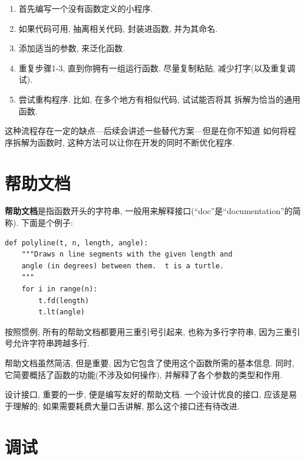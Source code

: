\documentclass[10pt]{book}
\begin{document}
\begin{enumerate}

\item 首先编写一个没有函数定义的小程序.

\item 如果代码可用, 抽离相关代码, 封装进函数, 并为其命名.

\item 添加适当的参数, 来泛化函数.

\item 重复步骤1-3, 直到你拥有一组运行函数. 尽量复制粘贴, 减少打字(以及重复调试).

\item 尝试重构程序. 比如, 在多个地方有相似代码, 试试能否将其
拆解为恰当的通用函数.

\end{enumerate}

这种流程存在一定的缺点---后续会讲述一些替代方案---但是在你不知道
如何将程序拆解为函数时, 这种方法可以让你在开发的同时不断优化程序. 

\section{帮助文档}
\label{docstring}
{\bf 帮助文档}是指函数开头的字符串, 一般用来解释接口(``doc''是``documentation''的简称).
下面是个例子:

\begin{verbatim}
def polyline(t, n, length, angle):
    """Draws n line segments with the given length and
    angle (in degrees) between them.  t is a turtle.
    """    
    for i in range(n):
        t.fd(length)
        t.lt(angle)
\end{verbatim}
%
按照惯例, 所有的帮助文档都要用三重引号引起来, 也称为多行字符串, 
因为三重引号允许字符串跨越多行. 

帮助文档虽然简洁, 但是重要, 因为它包含了使用这个函数所需的基本信息. 
同时, 它简要概括了函数的功能(不涉及如何操作), 
并解释了各个参数的类型和作用. 

设计接口, 重要的一步, 便是编写友好的帮助文档. 
一个设计优良的接口, 应该是易于理解的;
如果需要耗费大量口舌讲解, 那么这个接口还有待改进. 


\section{调试}
\end{document}
